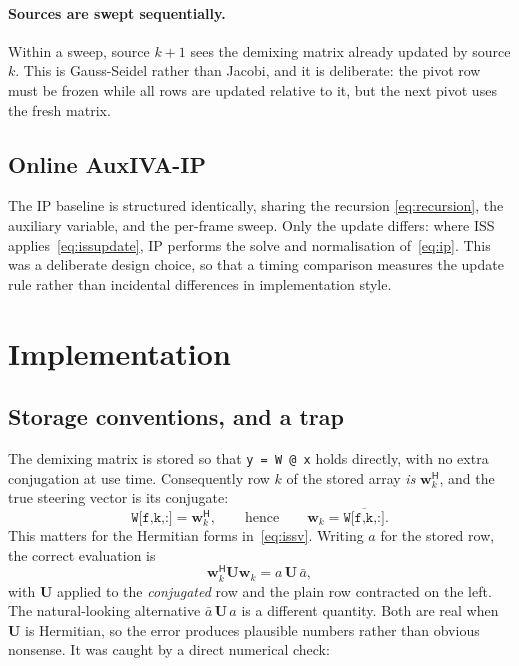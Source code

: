 \documentclass[11pt,a4paper]{article}
\newcommand{\U}{\boldsymbol{U}}
\newcommand{\w}{\boldsymbol{w}}
\newcommand{\herm}{^{\mathsf{H}}}
\begin{document}
\paragraph{Sources are swept sequentially.} Within a sweep, source $k+1$ sees
the demixing matrix already updated by source $k$. This is Gauss-Seidel rather
than Jacobi, and it is deliberate: the pivot row must be frozen while all rows
are updated relative to it, but the next pivot uses the fresh matrix.

\subsection{Online AuxIVA-IP}

The IP baseline is structured identically, sharing the recursion
\eqref{eq:recursion}, the auxiliary variable, and the per-frame sweep. Only the
update differs: where ISS applies~\eqref{eq:issupdate}, IP performs the solve
and normalisation of~\eqref{eq:ip}. This was a deliberate design choice, so that
a timing comparison measures the update rule rather than incidental differences
in implementation style.

\section{Implementation}

\subsection{Storage conventions, and a trap}
\label{sec:conventions}

The demixing matrix is stored so that \verb|y = W @ x| holds directly, with no
extra conjugation at use time. Consequently row $k$ of the stored array
\emph{is} $\w_k\herm$, and the true steering vector is its conjugate:
%
\begin{equation}
\texttt{W[f,k,:]} = \w_k\herm,
\qquad\text{hence}\qquad
\w_k = \overline{\texttt{W[f,k,:]}} .
\end{equation}
%
This matters for the Hermitian forms in~\eqref{eq:issv}. Writing $a$ for the
stored row, the correct evaluation is
%
\begin{equation}
\w_k\herm \U \w_k = a\,\U\,\bar{a},
\end{equation}
%
with $\U$ applied to the \emph{conjugated} row and the plain row contracted on
the left. The natural-looking alternative $\bar{a}\,\U\,a$ is a different
quantity. Both are real when $\U$ is Hermitian, so the error produces
plausible numbers rather than obvious nonsense. It was caught by a direct
numerical check:
\end{document}
